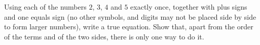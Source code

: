 Using each of the numbers $2$, $3$, $4$ and $5$ exactly once, together with plus signs and one equals sign (no other symbols, and digits may not be placed side by side to form larger numbers), write a true equation. Show that, apart from the order of the terms and of the two sides, there is only one way to do it.
